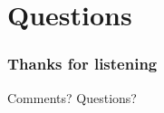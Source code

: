 \section*{Questions}
\begin{frame}[fragile]
\frametitle{Thanks for listening}
Comments? Questions?
\end{frame}